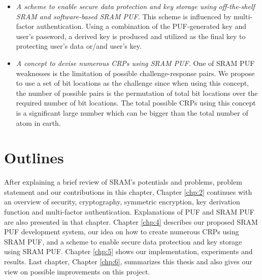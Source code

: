\begin{itemize}
    \item \textit{A scheme to enable secure data protection and key storage using off-the-shelf SRAM and software-based SRAM PUF.} This scheme is influenced by multi-factor authentication. Using a combination of the PUF-generated key and user's password, a derived key is produced and utilized as the final key to protecting user's data or/and user's key.
    \item \textit{A concept to devise numerous CRPs using SRAM PUF.} One of SRAM PUF weaknesses is the limitation of possible challenge-response pairs. We propose to use a set of bit locations as the challenge since when using this concept, the number of possible pairs is the permutation of total bit locations over the required number of bit locations. The total possible CRPs using this concept is a significant large number which can be bigger than the total number of atom in earth.
\end{itemize}


\section{Outlines}
After explaining a brief review of SRAM's potentials and problems, problem statement and our contributions in this chapter,
Chapter \ref{chp:2} continues with an overview of security, cryptography, symmetric encryption, key derivation function and multi-factor authentication. Explanations of PUF and SRAM PUF are also presented in that chapter. Chapter \ref{chp:4} describes our proposed SRAM PUF development system, our idea on how to create numerous CRPs using SRAM PUF, and a scheme to enable secure data protection and key storage using SRAM PUF. Chapter \ref{chp:5} shows our implementation, experiments and results. Last chapter, Chapter \ref{chp:6}, summarizes this thesis and also gives our view on possible improvements on this project.
